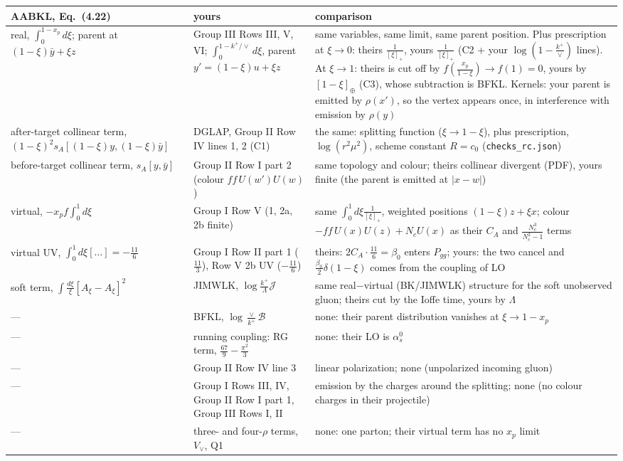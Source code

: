 \documentclass[9pt]{article}
\numberwithin{equation}{section}
\begin{document}
\begin{center}\small\renewcommand{\arraystretch}{1.25}
\begin{longtable}{@{}>{\raggedright\arraybackslash}p{}>{\raggedright\arraybackslash}p{}>{\raggedright\arraybackslash}p{}@{}}\toprule
AABKL, Eq.~(4.22) & yours & comparison\\\midrule\endhead
real, $\int_0^{1-x_p}d\xi$; parent at $(1-\xi)\bar y+\xi z$ & Group III Rows III, V, VI; $\int_0^{1-k^+/\vee}d\xi$, parent $y'=(1-\xi)u+\xi z$ & same variables, same limit, same parent position. Plus prescription at $\xi\to0$: theirs $\frac{1}{[\xi]_+}$, yours $\frac{1}{[\xi]_+}$ (C2 + your $\log(1-\frac{k^+}{\vee})$ lines). At $\xi\to1$: theirs is cut off by $f(\frac{x_p}{1-\xi})\to f(1)=0$, yours by $[1-\xi]_\oplus$ (C3), whose subtraction is BFKL. Kernels: your parent is emitted by $\rho(x')$, so the vertex appears once, in interference with emission by $\rho(y)$\\
after-target collinear term, $(1-\xi)^2s_A[(1-\xi)y,(1-\xi)\bar y]$ & DGLAP, Group II Row IV lines 1, 2 (C1) & the same: splitting function ($\xi\to1-\xi$), plus prescription, $\log(r^2\mu^2)$, scheme constant $R=c_0$ (\texttt{checks\_rc.json})\\
before-target collinear term, $s_A[y,\bar y]$ & Group II Row I part 2 (colour $f\!f\,U(w')U(w)$) & same topology and colour; theirs collinear divergent (PDF), yours finite (the parent is emitted at $|x-w|$)\\
virtual, $-x_pf\int_0^1d\xi$ & Group I Row V (1, 2a, 2b finite) & same $\int_0^1d\xi\frac{1}{[\xi]_+}$, weighted positions $(1-\xi)z+\xi x$; colour $-f\!f\,U(x)U(z)+N_cU(x)$ as their $C_A$ and $\frac{N_c^3}{N_c^2-1}$ terms\\
virtual UV, $\int_0^1d\xi[\dots]=-\frac{11}{6}$ & Group I Row II part 1 ($\frac{11}{3}$), Row V 2b UV ($-\frac{11}{6}$) & theirs: $2C_A\cdot\frac{11}{6}=\beta_0$ enters $P_{gg}$; yours: the two cancel and $\frac{\beta_0}{2}\delta(1-\xi)$ comes from the coupling of LO\\
soft term, $\int\frac{d\xi}{\xi}[A_\xi-A_\xi]^2$ & JIMWLK, $\log\frac{k^+}{\Lambda}\mathcal J$ & same real$-$virtual (BK/JIMWLK) structure for the soft unobserved gluon; theirs cut by the Ioffe time, yours by $\Lambda$\\
--- & BFKL, $\log\frac{\vee}{k^+}\mathcal B$ & none: their parent distribution vanishes at $\xi\to1-x_p$\\
--- & running coupling: RG term, $\frac{67}{9}-\frac{\pi^2}{3}$ & none: their LO is $\alpha_s^0$\\
--- & Group II Row IV line 3 & linear polarization; none (unpolarized incoming gluon)\\
--- & Group I Rows III, IV, Group II Row I part 1, Group III Rows I, II & emission by the charges around the splitting; none (no colour charges in their projectile)\\
--- & three- and four-$\rho$ terms, $V_\vee$, Q1 & none: one parton; their virtual term has no $x_p$ limit\\\bottomrule
\end{longtable}
\end{center}
\end{document}
